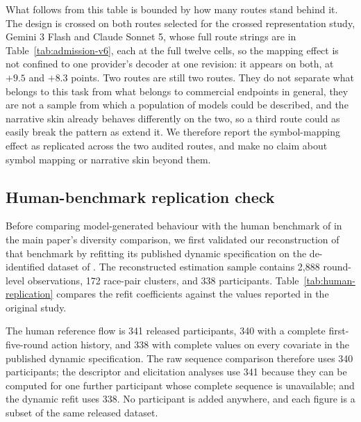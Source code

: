 \documentclass[sigconf,anonymous]{aamas}
\begin{document}
What follows from this table is bounded by how many routes stand behind it.
The design is crossed on both routes selected for the crossed representation
study, Gemini 3 Flash and Claude
Sonnet 5, whose full route strings are in
Table~\ref{tab:admission-v6}, each at the full twelve cells, so
the mapping effect is not confined to one provider's decoder at one revision:
it appears on both, at $+9.5$ and $+8.3$ points. Two routes are still two
routes. They do not separate what belongs to this task from what belongs to
commercial endpoints in general, they are not a sample from which a population
of models could be described, and the narrative skin already behaves
differently on the two, so a third route could as easily break the pattern as
extend it. We therefore report the symbol-mapping effect as replicated across
the two audited routes, and make no claim about symbol mapping or narrative
skin beyond them.

\subsection{Human-benchmark replication check}
\label{app:human-benchmark-replication}

Before comparing model-generated behaviour with the human benchmark of
\citet{falling_behind_unsafe} in the main paper's diversity comparison, we first
validated our reconstruction of that benchmark by refitting its published
dynamic specification on the de-identified dataset of
\citet{falling_behind_unsafe}. The
reconstructed estimation sample contains 2{,}888 round-level observations,
172 race-pair clusters, and 338 participants. Table~\ref{tab:human-replication} compares the refit coefficients against the values reported in the
original study.

The human reference flow is 341 released participants, 340 with a complete
first-five-round action history, and 338 with complete values on every
covariate in the published dynamic specification. The raw sequence comparison
therefore uses 340 participants; the descriptor and elicitation analyses use
341 because they can be computed for one further participant whose complete
sequence is unavailable; and the dynamic refit uses 338. No participant is
added anywhere, and each figure is a subset of the same released dataset.
\end{document}
